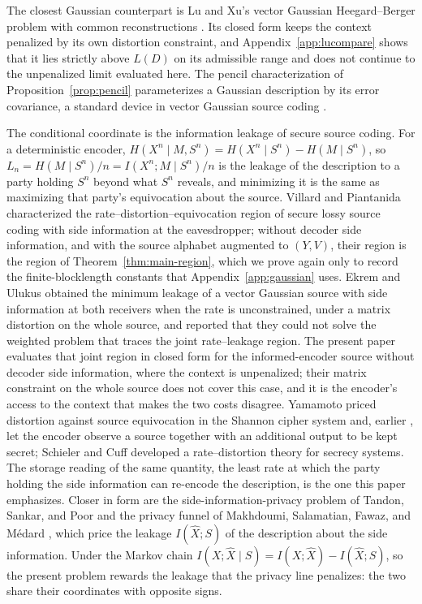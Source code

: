 \documentclass[11pt,onecolumn]{IEEEtran}
\newcommand{\hX}{\widehat{X}}
\begin{document}
The closest Gaussian counterpart is Lu and Xu's vector Gaussian
Heegard--Berger problem with common reconstructions \cite{luxu2021}.
Its closed form keeps the context penalized by its own distortion
constraint, and Appendix~\ref{app:lucompare} shows that it lies strictly
above $L(D)$ on its admissible range and does not continue to the
unpenalized limit evaluated here. The pencil characterization of
Proposition~\ref{prop:pencil} parameterizes a Gaussian description by
its error covariance, a standard device in vector Gaussian source coding
\cite{rahman2012}.


The conditional coordinate is the information leakage of secure source
coding. For a deterministic encoder,
$H(X^n\mid M,S^n)=H(X^n\mid S^n)-H(M\mid S^n)$, so $L_n=H(M\mid S^n)/n
=I(X^n;M\mid S^n)/n$ is the leakage of the description to a party holding
$S^n$ beyond what $S^n$ reveals, and minimizing it is the same as
maximizing that party's equivocation about the source. Villard and
Piantanida \cite[Theorem~3]{villard2013} characterized the
rate--distortion--equivocation region of secure lossy source coding with
side information at the eavesdropper; without decoder side information,
and with the source alphabet augmented to $(Y,V)$, their region is the
region of Theorem~\ref{thm:main-region}, which we prove again only to
record the finite-blocklength constants that Appendix~\ref{app:gaussian}
uses. Ekrem and Ulukus \cite{ekrem2013} obtained the minimum leakage of a
vector Gaussian source with side information at both receivers when the
rate is unconstrained, under a matrix distortion on the whole source, and
reported that they could not solve the weighted problem that traces the
joint rate--leakage region. The present paper evaluates that joint region
in closed form for the informed-encoder source without decoder side
information, where the context is unpenalized; their matrix constraint
on the whole source does not cover this case, and it is the encoder's
access to the context that makes the two costs disagree. Yamamoto priced
distortion against source equivocation in the Shannon cipher system
\cite{yamamoto1997} and, earlier \cite{yamamoto1983}, let the encoder
observe a source together with an additional output to be kept secret;
Schieler and Cuff \cite{schieler2014} developed a rate--distortion theory
for secrecy systems. The storage reading of the same quantity, the least
rate at which the party holding the side information can re-encode the
description, is the one this paper emphasizes. Closer in form are the
side-information-privacy problem of Tandon, Sankar, and Poor
\cite{tandon2013} and the privacy funnel of Makhdoumi, Salamatian,
Fawaz, and M\'edard \cite{makhdoumi2014}, which price the leakage
$I(\hX;S)$ of the description about the side information. Under the
Markov chain $I(X;\hX\mid S)=I(X;\hX)-I(\hX;S)$, so the present problem
rewards the leakage that the privacy line penalizes: the two share
their coordinates with opposite signs.
\end{document}
